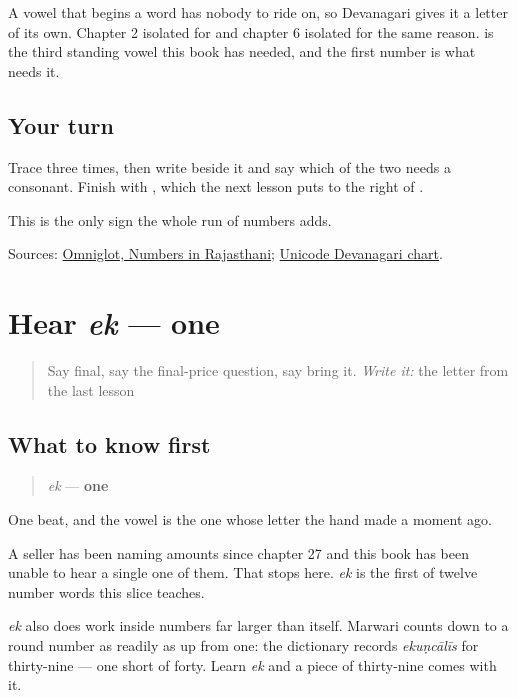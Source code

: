 A vowel that begins a word has nobody to ride on, so Devanagari gives it a letter of its own. Chapter 2 isolated \textbf{} for \textbf{} and chapter 6 isolated \textbf{} for the same reason. \textbf{} is the third standing vowel this book has needed, and the first number is what needs it.

\subsection*{Your turn}
Trace \textbf{} three times, then write \textbf{} beside it and say which of the two needs a consonant. Finish with \textbf{}, which the next lesson puts to the right of \textbf{}.

\begin{tcolorbox}[breakable,colback=teal!4,colframe=teal!35!black,title={Before you move on}]
This is the only sign the whole run of numbers adds.

Sources: \href{https://www.omniglot.com/language/numbers/rajasthani.htm}{Omniglot, Numbers in Rajasthani}; \href{https://www.unicode.org/charts/PDF/U0900.pdf}{Unicode Devanagari chart}.
\end{tcolorbox}
\section[ek]{Hear \emph{ek} — one}

\label{lesson:MW-C32-hear-ek}



\begin{quote}
Say final, say the final-price question, say bring it. \emph{Write it:} the letter from the last lesson
\end{quote}

\subsection*{What to know first}
\begin{quote}
\emph{ek} — \textbf{one}
\end{quote}

One beat, and the vowel is the one whose letter the hand made a moment ago.

A seller has been naming amounts since chapter 27 and this book has been unable to hear a single one of them. That stops here. \emph{ek} is the first of twelve number words this slice teaches.

\emph{ek} also does work inside numbers far larger than itself. Marwari counts down to a round number as readily as up from one: the dictionary records \emph{ekuṇcālīs} for thirty-nine — one short of forty. Learn \emph{ek} and a piece of thirty-nine comes with it.

